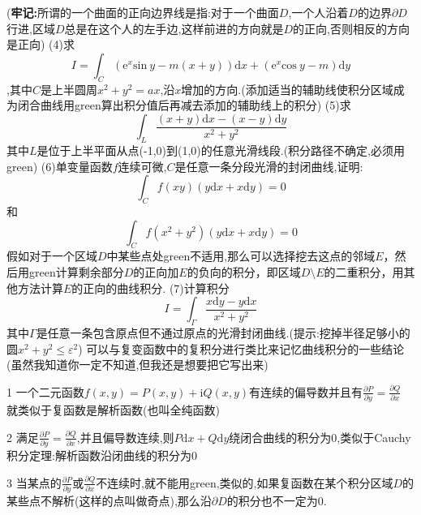 \documentclass{ctexart}
\begin{document}
(\textbf{牢记:}所谓的一个曲面的正向边界线是指:对于一个曲面$D$,一个人沿着$D$的边界$\partial D$行进,区域$D$总是在这个人的左手边,这样前进的方向就是$D$的正向,否则相反的方向是正向)
\newline
\newline
(4)求$$I=\int_{C}(\mathrm{e}^{x}\mathrm{sin}\ y-m(x+y))\mathrm{d}x+(\mathrm{e}^{x}\mathrm{cos}\ y-m)\mathrm{d}y$$,其中$C$是上半圆周$x^{2}+y^{2}=ax$,沿$x$增加的方向.(添加适当的辅助线使积分区域成为闭合曲线用green算出积分值后再减去添加的辅助线上的积分)
\newline
\newline
(5)求$$\int_{L}\frac{(x+y)\mathrm{d}x-(x-y)\mathrm{d}y}{x^{2}+y^{2}}$$其中$L$是位于上半平面从点(-1,0)到(1,0)的任意光滑线段.(积分路径不确定,必须用green)
\newline
\newline
(6)单变量函数$f$连续可微,$C$是任意一条分段光滑的封闭曲线,证明:$$\int_{C}f(xy)(y\mathrm{d}x+x\mathrm{d}y)=0$$和$$\int_{C}f(x^{2}+y^{2})(y\mathrm{d}x+x\mathrm{d}y)=0$$
\newline
\newline
假如对于一个区域$D$中某些点处green不适用,那么可以选择挖去这点的邻域$E$，然后用green计算剩余部分$D$的正向加$E$的负向的积分，即区域$D\setminus E$的二重积分，用其他方法计算$E$的正向的曲线积分.
\newline
\newline
(7)计算积分$$I=\int_{\Gamma}\frac{x\mathrm{d}y-y\mathrm{d}x}{x^{2}+y^{2}}$$其中$\Gamma$是任意一条包含原点但不通过原点的光滑封闭曲线.(提示:挖掉半径足够小的圆$x^{2}+y^{2}\leq \varepsilon^{2}$)
\newline
\newline
\newline
可以与复变函数中的复积分进行类比来记忆曲线积分的一些结论(虽然我知道你一定不知道,但我还是想要把它写出来)

\textcircled{\footnotesize{1}} 一个二元函数$f(x,y)=P(x,y)+\mathrm{i}Q(x,y)$有连续的偏导数并且有$\frac{\partial P}{\partial y}=\frac{\partial Q}{\partial x}$ 就类似于复函数是解析函数(也叫全纯函数)

\textcircled{\footnotesize{2}} 满足$\frac{\partial P}{\partial y}=\frac{\partial Q}{\partial x}$,并且偏导数连续,则$P\mathrm{d}x+Q\mathrm{d}y$绕闭合曲线的积分为0,类似于Cauchy积分定理:解析函数沿闭曲线的积分为0

\textcircled{\footnotesize{3}} 当某点的$\frac{\partial P}{\partial y}$或$\frac{\partial Q}{\partial x}$不连续时,就不能用green,类似的,如果复函数在某个积分区域$D$的某些点不解析(这样的点叫做奇点),那么沿$\partial D$的积分也不一定为0.
\end{document}
